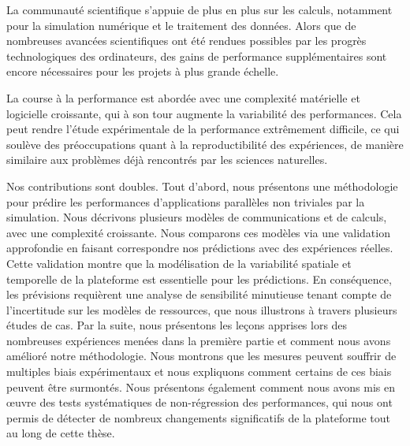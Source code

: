 La communauté scientifique s'appuie de plus en plus sur les calculs, notamment pour la simulation numérique et le
traitement des données. Alors que de nombreuses avancées scientifiques ont été rendues possibles par les progrès
technologiques des ordinateurs, des gains de performance supplémentaires sont encore nécessaires pour les projets à plus
grande échelle.

La course à la performance est abordée avec une complexité matérielle et logicielle croissante, qui à son tour augmente
la variabilité des performances. Cela peut rendre l'étude expérimentale de la performance extrêmement difficile, ce qui
soulève des préoccupations quant à la reproductibilité des expériences, de manière similaire aux problèmes déjà
rencontrés par les sciences naturelles.

Nos contributions sont doubles. Tout d'abord, nous présentons une méthodologie pour prédire les performances
d'applications parallèles non triviales par la simulation.  Nous décrivons plusieurs modèles de communications et de
calculs, avec une complexité croissante. Nous comparons ces modèles via une validation approfondie en faisant
correspondre nos prédictions avec des expériences réelles. Cette validation montre que la modélisation de la variabilité
spatiale et temporelle de la plateforme est essentielle pour les prédictions. En conséquence, les prévisions requièrent
une analyse de sensibilité minutieuse tenant compte de l'incertitude sur les modèles de ressources, que nous illustrons
à travers plusieurs études de cas. Par la suite, nous présentons les leçons apprises lors des nombreuses expériences
menées dans la première partie et comment nous avons amélioré notre méthodologie. Nous montrons que les mesures peuvent
souffrir de multiples biais expérimentaux et nous expliquons comment certains de ces biais peuvent être surmontés. Nous
présentons également comment nous avons mis en œuvre des tests systématiques de non-régression des performances, qui
nous ont permis de détecter de nombreux changements significatifs de la plateforme tout au long de cette thèse.
